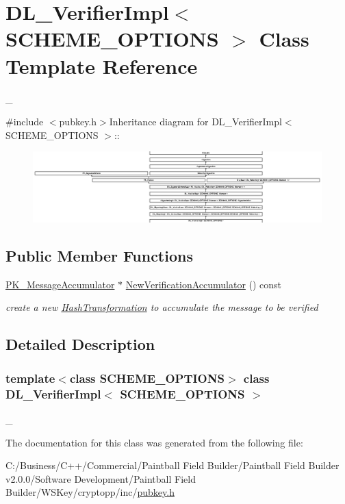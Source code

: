 \hypertarget{class_d_l___verifier_impl}{
\section{DL\_\-VerifierImpl$<$ SCHEME\_\-OPTIONS $>$ Class Template Reference}
\label{class_d_l___verifier_impl}
}


\_\-  


{\ttfamily \#include $<$pubkey.h$>$}Inheritance diagram for DL\_\-VerifierImpl$<$ SCHEME\_\-OPTIONS $>$::\begin{figure}[H]
\begin{center}
\leavevmode
\includegraphics[height=2.7451cm]{class_d_l___verifier_impl}
\end{center}
\end{figure}
\subsection*{Public Member Functions}
\begin{DoxyCompactItemize}
\item 
\hypertarget{class_d_l___verifier_impl_a7f28abeb9d19c16334cc9b2530019be8}{
\hyperlink{class_p_k___message_accumulator}{PK\_\-MessageAccumulator} $\ast$ \hyperlink{class_d_l___verifier_impl_a7f28abeb9d19c16334cc9b2530019be8}{NewVerificationAccumulator} () const }
\label{class_d_l___verifier_impl_a7f28abeb9d19c16334cc9b2530019be8}

\begin{DoxyCompactList}\small\item\em create a new \hyperlink{class_hash_transformation}{HashTransformation} to accumulate the message to be verified \item\end{DoxyCompactList}\end{DoxyCompactItemize}


\subsection{Detailed Description}
\subsubsection*{template$<$class SCHEME\_\-OPTIONS$>$ class DL\_\-VerifierImpl$<$ SCHEME\_\-OPTIONS $>$}

\_\- 

The documentation for this class was generated from the following file:\begin{DoxyCompactItemize}
\item 
C:/Business/C++/Commercial/Paintball Field Builder/Paintball Field Builder v2.0.0/Software Development/Paintball Field Builder/WSKey/cryptopp/inc/\hyperlink{pubkey_8h}{pubkey.h}\end{DoxyCompactItemize}
